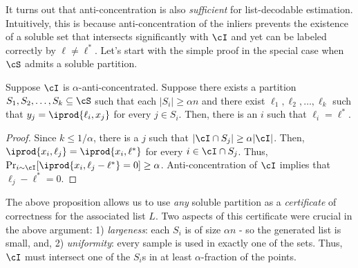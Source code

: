 
It turns out that anti-concentration is also \emph{sufficient} for list-decodable estimation. Intuitively, this is because anti-concentration of the inliers prevents the existence of a soluble set that intersects significantly with $\cI$ and yet can be labeled correctly by $\ell \neq \ell^*$. Let's start with the simple proof in the special case when $\cS$ admits a soluble partition. %



\begin{proposition}
Suppose $\cI$ is $\alpha$-anti-concentrated. Suppose there exists a partition $S_1, S_2,\ldots, S_k \subseteq \cS$ such that each $|S_i| \geq \alpha n$ and there exist $\ell_1, \ell_2, \ldots, \ell_k$ such that $y_j = \iprod{\ell_i, x_j}$ for every $j \in S_i$. Then, there is an $i$ such that $\ell_i = \ell^*$. \label{prop:simple-uniqueness-partition}
\end{proposition}

\begin{proof}
Since $k \leq 1/\alpha$, there is a $j$ such that $|\cI \cap S_j| \geq \alpha |\cI|$. 
Then, $\iprod{x_i, \ell_j}= \iprod{x_i, \ell^*}$ for every $i \in \cI \cap S_j$. 
Thus, $\Pr_{i \sim \cI}[\iprod{x_i,\ell_j-\ell^*} = 0]\geq \alpha$. Anti-concentration of $\cI$ implies that $\ell_j - \ell^* = 0$.
\end{proof}

The above proposition allows us to use \emph{any} soluble partition as a \emph{certificate} of correctness for the associated list $L$. Two aspects of this certificate were crucial in the above argument: 1) \emph{largeness}: each $S_i$ is of size $\alpha n$ - so the generated list is small, and, 2) \emph{uniformity}: every sample is used in exactly one of the sets. Thus, $\cI$ must intersect one of the $S_i$s in at least $\alpha$-fraction of the points. 

